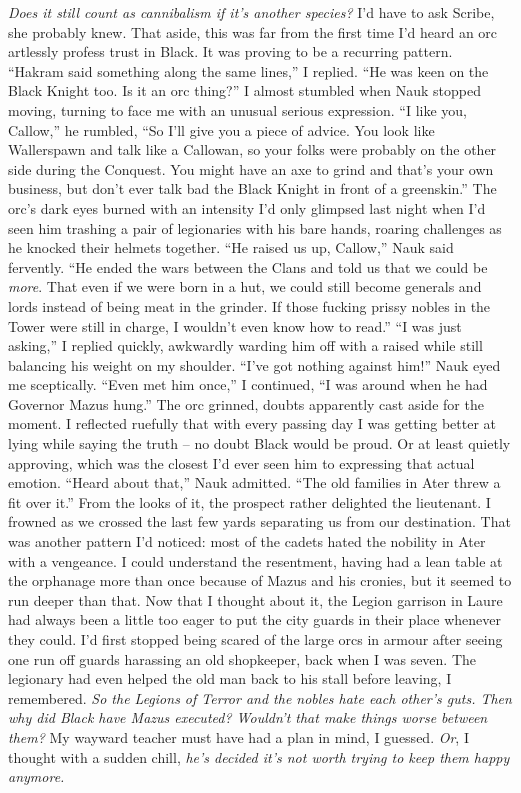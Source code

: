 \documentclass[12pt, openany]{book}
\begin{document}
\textit{Does it still count as cannibalism if it’s another species?} I’d have to ask Scribe, she probably knew. That aside, this was far from the first time I’d heard an orc artlessly profess trust in Black. It was proving to be a recurring pattern.
“Hakram said something along the same lines,” I replied. “He was keen on the Black Knight too. Is it an orc thing?”
I almost stumbled when Nauk stopped moving, turning to face me with an unusual serious expression.
“I like you, Callow,” he rumbled, “So I’ll give you a piece of advice. You look like Wallerspawn and talk like a Callowan, so your folks were probably on the other side during the Conquest. You might have an axe to grind and that’s your own business, but don’t ever talk bad the Black Knight in front of a greenskin.”
The orc’s dark eyes burned with an intensity I’d only glimpsed last night when I’d seen him trashing a pair of legionaries with his bare hands, roaring challenges as he knocked their helmets together.
“He raised us up, Callow,” Nauk said fervently. “He ended the wars between the Clans and told us that we could be \textit{more}. That even if we were born in a hut, we could still become generals and lords instead of being meat in the grinder. If those fucking prissy nobles in the Tower were still in charge, I wouldn’t even know how to read.”
“I was just asking,” I replied quickly, awkwardly warding him off with a raised while still balancing his weight on my shoulder. “I’ve got nothing against him!”
Nauk eyed me sceptically.
“Even met him once,” I continued, “I was around when he had Governor Mazus hung.”
The orc grinned, doubts apparently cast aside for the moment. I reflected ruefully that with every passing day I was getting better at lying while saying the truth – no doubt Black would be proud. Or at least quietly approving, which was the closest I’d ever seen him to expressing that actual emotion.
“Heard about that,” Nauk admitted. “The old families in Ater threw a fit over it.”
From the looks of it, the prospect rather delighted the lieutenant. I frowned as we crossed the last few yards separating us from our destination. That was another pattern I’d noticed: most of the cadets hated the nobility in Ater with a vengeance. I could understand the resentment, having had a lean table at the orphanage more than once because of Mazus and his cronies, but it seemed to run deeper than that. Now that I thought about it, the Legion garrison in Laure had always been a little too eager to put the city guards in their place whenever they could. I’d first stopped being scared of the large orcs in armour after seeing one run off guards harassing an old shopkeeper, back when I was seven. The legionary had even helped the old man back to his stall before leaving, I remembered. \textit{So the Legions of Terror and the nobles hate each other’s guts. Then why did Black have Mazus executed? Wouldn’t that make things worse between them?} My wayward teacher must have had a plan in mind, I guessed. \textit{Or}, I thought with a sudden chill, \textit{he’s decided it’s not worth trying to keep them happy anymore.}
\end{document}
